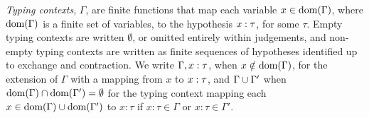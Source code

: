 
\emph{Typing contexts}, $\Gamma$, are finite functions that map each variable $x \in \text{dom}(\Gamma)$, where $\text{dom}(\Gamma)$ is a finite set of variables, to the hypothesis $x : \tau$, for some $\tau$. Empty typing contexts are written $\emptyset$, or omitted entirely within judgements, and non-empty typing contexts are written as finite sequences of hypotheses identified up to exchange and contraction. We write $\Gamma, x : \tau$, when $x \notin \text{dom}(\Gamma)$, for the extension of $\Gamma$ with a mapping from $x$ to $x : \tau$, and ${\Gamma}\cup{\Gamma'}$ when $\text{dom}(\Gamma) \cap \text{dom}(\Gamma') = \emptyset$ for the typing context mapping each $x \in \text{dom}(\Gamma) \cup \text{dom}(\Gamma')$ to $x : \tau$ if $x : \tau \in \Gamma$ or $x : \tau \in \Gamma'$. %

